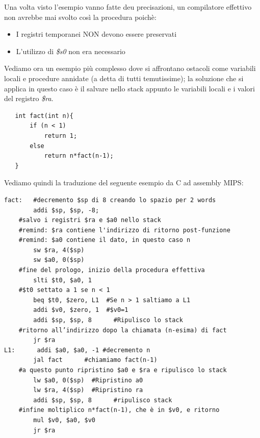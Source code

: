 \documentclass[class=book, crop=false]{standalone}
\begin{document}
Una volta visto l'esempio vanno fatte deu precisazioni, un compilatore effettivo non avrebbe mai svolto così la procedura poichè:
\begin{itemize}[nolistsep, noitemsep]
	\item I registri temporanei NON devono essere preservati
	\item L'utilizzo di \emph{\$s0} non era necessario
\end{itemize}

Vediamo ora un esempio più complesso dove si affrontano ostacoli come variabili locali e procedure annidate (a detta di tutti temutissime); la soluzione che si applica in questo caso è il salvare nello stack appunto le variabili locali e i valori del registro \emph{\$ra}.

\begin{verbatim}
   int fact(int n){
	   if (n < 1)
		   return 1;
	   else
		   return n*fact(n-1);
   }
\end{verbatim}

Vediamo quindi la traduzione del seguente esempio da C ad assembly MIPS:

\begin{verbatim}
fact:   #decremento $sp di 8 creando lo spazio per 2 words
		addi $sp, $sp, -8;
	#salvo i registri $ra e $a0 nello stack
	#remind: $ra contiene l'indirizzo di ritorno post-funzione
	#remind: $a0 contiene il dato, in questo caso n
		sw $ra, 4($sp)
		sw $a0, 0($sp)
	#fine del prologo, inizio della procedura effettiva
		slti $t0, $a0, 1
	#$t0 settato a 1 se n < 1
		beq $t0, $zero, L1	#Se n > 1 saltiamo a L1
		addi $v0, $zero, 1	#$v0=1
		addi $sp, $sp, 8	  #Ripulisco lo stack
	#ritorno all’indirizzo dopo la chiamata (n-esima) di fact
		jr $ra
L1:	     addi $a0, $a0, -1 #decremento n
		jal fact	  #chiamiamo fact(n-1)
	#a questo punto ripristino $a0 e $ra e ripulisco lo stack
		lw $a0, 0($sp)	#Ripristino a0
		lw $ra, 4($sp)	#Ripristino ra
		addi $sp, $sp, 8      #ripulisco stack
	#infine moltiplico n*fact(n-1), che è in $v0, e ritorno
		mul $v0, $a0, $v0
		jr $ra
\end{verbatim}
\end{document}
